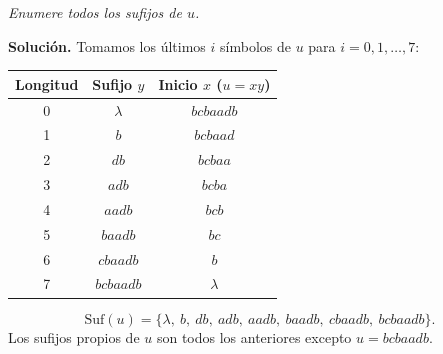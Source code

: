 \noindent\textit{Enumere todos los sufijos de $u$.}

\medskip
\noindent\textbf{Solución.} Tomamos los últimos $i$ símbolos de $u$ para
$i = 0, 1, \dots, 7$:

\begin{center}
    \begin{tabular}{|c|c|c|}
        \hline
        \textbf{Longitud} & \textbf{Sufijo $y$} & \textbf{Inicio $x$ ($u = xy$)} \\
        \hline
        0 & $\lambda$  & $bcbaadb$ \\
        1 & $b$        & $bcbaad$ \\
        2 & $db$       & $bcbaa$ \\
        3 & $adb$      & $bcba$ \\
        4 & $aadb$     & $bcb$ \\
        5 & $baadb$    & $bc$ \\
        6 & $cbaadb$   & $b$ \\
        7 & $bcbaadb$  & $\lambda$ \\
        \hline
    \end{tabular}
\end{center}

\[
\text{Suf}(u) = \{\lambda,\ b,\ db,\ adb,\ aadb,\ baadb,\ cbaadb,\ bcbaadb\}.
\]
Los sufijos propios de $u$ son todos los anteriores excepto $u = bcbaadb$.